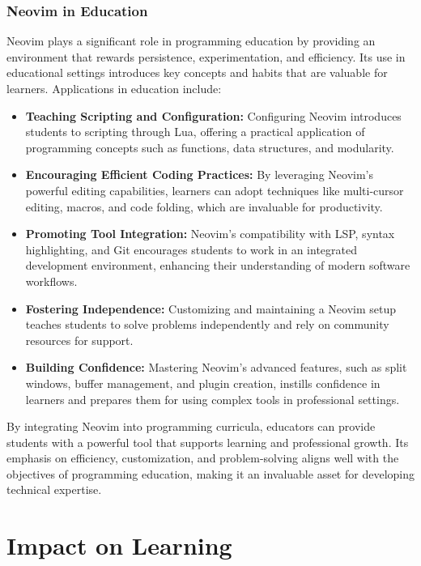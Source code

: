 \documentclass[12pt]{article}
\begin{document}
\subsubsection{Neovim in Education}
Neovim plays a significant role in programming education by providing an environment that rewards persistence, experimentation, and efficiency. Its use in educational settings introduces key concepts and habits that are valuable for learners. Applications in education include:  

\begin{itemize}
    \item \textbf{Teaching Scripting and Configuration:} Configuring Neovim introduces students to scripting through Lua, offering a practical application of programming concepts such as functions, data structures, and modularity.  
    \item \textbf{Encouraging Efficient Coding Practices:} By leveraging Neovim’s powerful editing capabilities, learners can adopt techniques like multi-cursor editing, macros, and code folding, which are invaluable for productivity.  
    \item \textbf{Promoting Tool Integration:} Neovim's compatibility with LSP, syntax highlighting, and Git encourages students to work in an integrated development environment, enhancing their understanding of modern software workflows.  
    \item \textbf{Fostering Independence:} Customizing and maintaining a Neovim setup teaches students to solve problems independently and rely on community resources for support.  
    \item \textbf{Building Confidence:} Mastering Neovim's advanced features, such as split windows, buffer management, and plugin creation, instills confidence in learners and prepares them for using complex tools in professional settings.  
\end{itemize}

By integrating Neovim into programming curricula, educators can provide students with a powerful tool that supports learning and professional growth. Its emphasis on efficiency, customization, and problem-solving aligns well with the objectives of programming education, making it an invaluable asset for developing technical expertise.


\section{Impact on Learning}
\end{document}
